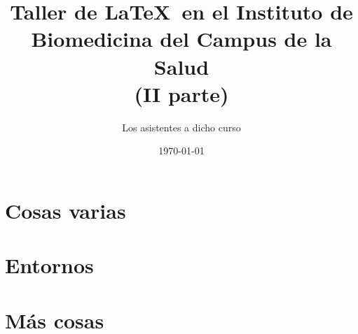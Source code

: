 \documentclass[11pt]{amsbook}
\title[Taller de LaTeX]{Taller de \LaTeX\ en el Instituto de Biomedicina del Campus de la Salud\\ (II parte)}
\author[Los presentes]{Los asistentes a dicho curso}
\date{\today}
\begin{document}
\frontmatter %

\maketitle



\tableofcontents

\mainmatter %



\part{Cosas varias}










\part{Entornos}



\part{Más cosas}








\backmatter %


\cleardoublepage
{}




\cleardoublepage
{}


\printindex
\end{document}
